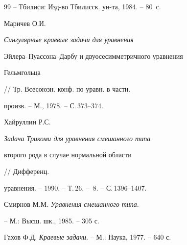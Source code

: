 \begin{thebibliography}{99}
-- Тбилиси: Изд-во Тбилисск. ун-та, 1984. -- 80~с. 




Маричев О.И. {\em Сингулярные краевые задачи для уравнения 


Эйлера--Пуассона--Дарбу и двуосесимметричного уравнения 


Гельмгольца} // Тр. Всесоюзн. конф. по уравн. в частн. 


произв. -- М., 1978. -- С.\,373--374. 




Хайруллин Р.С. {\em Задача Трикоми для уравнения смешанного типа 


второго рода в случае нормальной области} // Дифференц.


уравнения. -- 1990. -- Т.\,26. -- \No\,8. -- С.\,1396--1407. 




Смирнов М.М. {\em Уравнения смешанного типа}.


-- М.: Высш. шк., 1985. -- 305 с. 




Гахов Ф.Д. {\em Краевые задачи}. -- М.: Наука, 1977. -- 640 с. 


 


\end{thebibliography} 


 


\vskip 2cm 


 








 


\label{end} 


 


